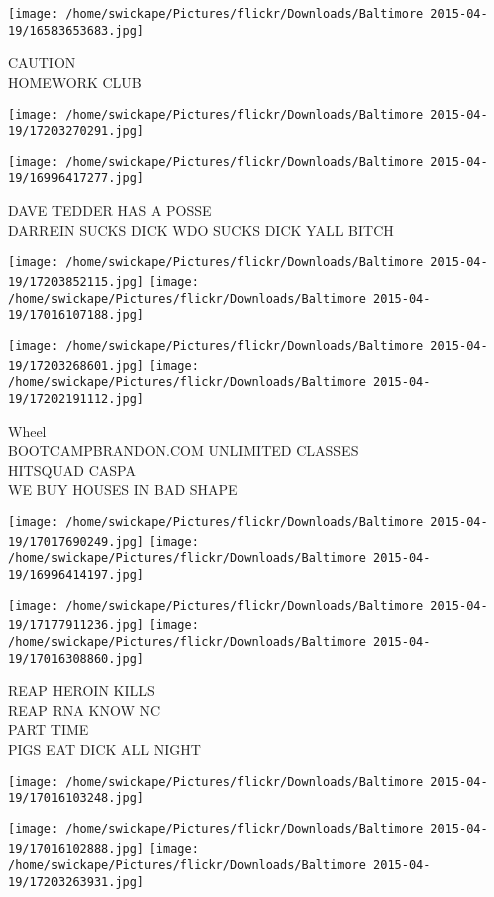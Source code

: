 \documentclass[10pt,letterpaper]{article}
\begin{document}
\vspace{0.25in}
\texttt{[image: /home/swickape/Pictures/flickr/Downloads/Baltimore 2015-04-19/16583653683.jpg]}

CAUTION\\
HOMEWORK CLUB
\pagebreak

\texttt{[image: /home/swickape/Pictures/flickr/Downloads/Baltimore 2015-04-19/17203270291.jpg]}

\vspace{0.25in}
\texttt{[image: /home/swickape/Pictures/flickr/Downloads/Baltimore 2015-04-19/16996417277.jpg]}

DAVE TEDDER HAS A POSSE\\
DARREIN SUCKS DICK WDO SUCKS DICK YALL BITCH
\pagebreak

\texttt{[image: /home/swickape/Pictures/flickr/Downloads/Baltimore 2015-04-19/17203852115.jpg]}
\texttt{[image: /home/swickape/Pictures/flickr/Downloads/Baltimore 2015-04-19/17016107188.jpg]}

\texttt{[image: /home/swickape/Pictures/flickr/Downloads/Baltimore 2015-04-19/17203268601.jpg]}
\texttt{[image: /home/swickape/Pictures/flickr/Downloads/Baltimore 2015-04-19/17202191112.jpg]}

Wheel\\
BOOTCAMPBRANDON.COM UNLIMITED CLASSES\\
HITSQUAD CASPA\\
WE BUY HOUSES IN BAD SHAPE
\pagebreak

\texttt{[image: /home/swickape/Pictures/flickr/Downloads/Baltimore 2015-04-19/17017690249.jpg]}
\texttt{[image: /home/swickape/Pictures/flickr/Downloads/Baltimore 2015-04-19/16996414197.jpg]}

\texttt{[image: /home/swickape/Pictures/flickr/Downloads/Baltimore 2015-04-19/17177911236.jpg]}
\texttt{[image: /home/swickape/Pictures/flickr/Downloads/Baltimore 2015-04-19/17016308860.jpg]}

REAP HEROIN KILLS\\
REAP RNA KNOW NC\\
PART TIME\\
PIGS EAT DICK ALL NIGHT
\pagebreak

\texttt{[image: /home/swickape/Pictures/flickr/Downloads/Baltimore 2015-04-19/17016103248.jpg]}

\vspace{0.25in}
\texttt{[image: /home/swickape/Pictures/flickr/Downloads/Baltimore 2015-04-19/17016102888.jpg]}
\texttt{[image: /home/swickape/Pictures/flickr/Downloads/Baltimore 2015-04-19/17203263931.jpg]}
\end{document}
